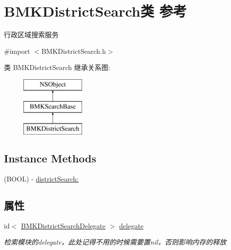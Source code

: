 \hypertarget{interface_b_m_k_district_search}{}\section{B\+M\+K\+District\+Search类 参考}
\label{interface_b_m_k_district_search}


行政区域搜索服务  




{\ttfamily \#import $<$B\+M\+K\+District\+Search.\+h$>$}

类 B\+M\+K\+District\+Search 继承关系图\+:\begin{figure}[H]
\begin{center}
\leavevmode
\includegraphics[height=3.000000cm]{interface_b_m_k_district_search}
\end{center}
\end{figure}
\subsection*{Instance Methods}
\begin{DoxyCompactItemize}
\item 
(B\+O\+O\+L) -\/ \hyperlink{interface_b_m_k_district_search_abec284e1b47fd329f06ab4db75186517}{district\+Search\+:}
\end{DoxyCompactItemize}
\subsection*{属性}
\begin{DoxyCompactItemize}
\item 
\hypertarget{interface_b_m_k_district_search_a88a7ec4f29691eb4c65845aec7000805}{}id$<$ \hyperlink{protocol_b_m_k_district_search_delegate-p}{B\+M\+K\+District\+Search\+Delegate} $>$ \hyperlink{interface_b_m_k_district_search_a88a7ec4f29691eb4c65845aec7000805}{delegate}\label{interface_b_m_k_district_search_a88a7ec4f29691eb4c65845aec7000805}

\begin{DoxyCompactList}\small\item\em 检索模块的delegate，此处记得不用的时候需要置nil，否则影响内存的释放 \end{DoxyCompactList}\end{DoxyCompactItemize}


